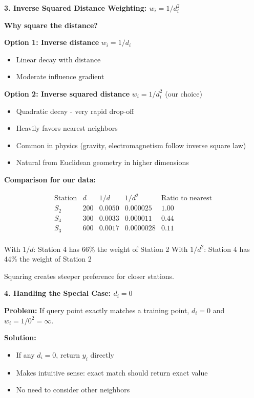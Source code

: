 \documentclass[12pt]{article}
\begin{document}
\begin{explanation}
\textbf{3. Inverse Squared Distance Weighting: \(w_i = 1/d_i^2\)}

\textbf{Why square the distance?}

\textbf{Option 1: Inverse distance} \(w_i = 1/d_i\)
\begin{itemize}
    \item Linear decay with distance
    \item Moderate influence gradient
\end{itemize}

\textbf{Option 2: Inverse squared distance} \(w_i = 1/d_i^2\) (our choice)
\begin{itemize}
    \item Quadratic decay - very rapid drop-off
    \item Heavily favors nearest neighbors
    \item Common in physics (gravity, electromagnetism follow inverse square law)
    \item Natural from Euclidean geometry in higher dimensions
\end{itemize}

\textbf{Comparison for our data:}

\[
\begin{array}{c|c|c|c|c}
\text{Station} & d & 1/d & 1/d^2 & \text{Ratio to nearest} \\
\hline
S_2 & 200 & 0.0050 & 0.000025 & 1.00 \\
S_4 & 300 & 0.0033 & 0.000011 & 0.44 \\
S_3 & 600 & 0.0017 & 0.0000028 & 0.11 \\
\end{array}
\]

With \(1/d\): Station 4 has 66\% the weight of Station 2
With \(1/d^2\): Station 4 has 44\% the weight of Station 2

Squaring creates steeper preference for closer stations.

\textbf{4. Handling the Special Case: \(d_i = 0\)}

\textbf{Problem:} If query point exactly matches a training point, \(d_i = 0\) and \(w_i = 1/0^2 = \infty\).

\textbf{Solution:}
\begin{itemize}
    \item If any \(d_i = 0\), return \(y_i\) directly
    \item Makes intuitive sense: exact match should return exact value
    \item No need to consider other neighbors
\end{itemize}


\end{explanation}
\end{document}
